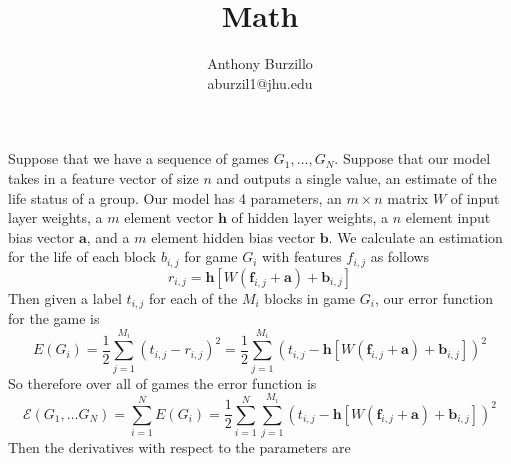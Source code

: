 \documentclass{amsart}
\title{Math}
\author{Anthony Burzillo\\aburzil1@jhu.edu}
\def\v#1{\mathbf{#1}}
\begin{document}
\maketitle

\def\touches#1#2{\mbox{touches}_{#1}{\left(#2\right)}}
\def\color#1{\mbox{color}{\left(#1\right)}}
\def\colorp#1{\mbox{color}^*{\left(#1\right)}}
\def\size#1{\mbox{size}{\left(#1\right)}}

Suppose that we have a sequence of games $G_1, \ldots, G_N$. Suppose that our model takes in a feature vector of
size $n$ and outputs a single value, an estimate of the life status of a group. Our model has 4 parameters, an
$m \times n$ matrix $W$ of input layer weights, a $m$ element vector $\v{ h }$ of hidden layer weights, a $n$ element
input bias vector $\v{ a }$, and a $m$ element hidden bias vector $\v{ b }$. We calculate an estimation for the life of
each block $b_{ i, j }$ for game $G_i$ with features $f_{ i, j }$ as follows
$$r_{ i, j } = \v{ h } [W(\v{ f }_{ i, j } + \v{ a }) + \v{ b }_{ i, j }]$$
Then given a label $t_{ i, j }$ for each of the $M_i$ blocks in game $G_i$, our error function for the game is
$$E(G_i) = \frac{ 1 }{ 2 } \sum_{ j = 1 }^{ M_i } (t_{ i, j } - r_{ i, j })^2
  = \frac{ 1 }{ 2 } \sum_{ j = 1 }^{ M_i } (t_{ i, j } - \v{ h } [W(\v{ f }_{ i, j } + \v{ a }) + \v{ b }_{ i, j }])^2$$
So therefore over all of games the error function is
$$\mathcal{ E }(G_1, \ldots G_N) = \sum_{ i = 1 }^N E(G_i)
  = \frac{ 1 }{ 2 } \sum_{ i = 1 }^N \sum_{ j = 1 }^{ M_i } (t_{ i, j } - \v{ h } [W(\v{ f }_{ i, j } + \v{ a }) + \v{ b }_{ i, j }])^2$$
Then the derivatives with respect to the parameters are
\end{document}
